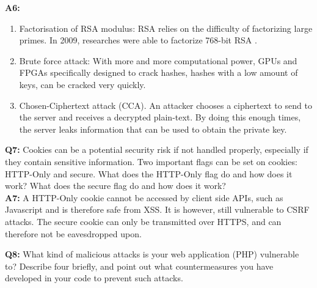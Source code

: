 \documentclass[paper=a4, fontsize=11pt]{article}
\begin{document}
    \textbf{A6:} 
    \begin{enumerate}
        \item Factorisation of RSA modulus: RSA relies on the difficulty of
            factorizing large primes. In 2009, researches were able to
            factorize 768-bit RSA \cite{kleinjung}.
        \item Brute force attack: With more and more computational power, GPUs
            and FPGAs specifically designed to crack hashes, hashes with a low
            amount of keys, can be cracked very quickly.
        \item Chosen-Ciphertext attack (CCA). An attacker chooses a ciphertext
            to send to the server and receives a decrypted plain-text. By doing
            this enough times, the server leaks information that can be used to
            obtain the private key.
    \end{enumerate}

    \textbf{Q7:} Cookies can be a potential security risk if not handled
    properly, especially if they contain sensitive information. Two important
    flags can be set on cookies: HTTP-Only and secure. What does the HTTP-Only
    flag do and how does it work? What does the secure flag do and how does it
    work?\\

    \textbf{A7:} A HTTP-Only cookie cannot be accessed by client side APIs,
    such as Javascript and is therefore safe from XSS. It is however, still
    vulnerable to CSRF attacks. The secure cookie can only be transmitted over
    HTTPS, and can therefore not be eavesdropped upon.

    \textbf{Q8:} What kind of malicious attacks is your web application (PHP)
    vulnerable to? Describe four briefly, and point out what countermeasures
    you have developed in your code to prevent such attacks.\\
\end{document}
